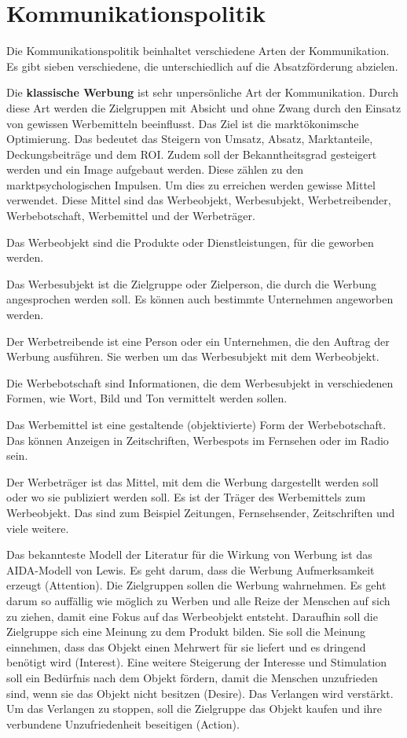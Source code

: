 \autocite[Vgl.][]{MarketingMB}
\section{Kommunikationspolitik}
Die Kommunikationspolitik beinhaltet verschiedene Arten der Kommunikation. Es gibt sieben verschiedene, die unterschiedlich auf die Absatzförderung abzielen. 

Die \textbf{klassische Werbung} ist sehr unpersönliche Art der Kommunikation. Durch diese Art werden die Zielgruppen mit Absicht und ohne Zwang durch den Einsatz von gewissen Werbemitteln beeinflusst. Das Ziel ist die marktökonimsche Optimierung. Das bedeutet das Steigern von Umsatz, Absatz, Marktanteile, Deckungsbeiträge und dem ROI. Zudem soll der Bekanntheitsgrad gesteigert werden und ein Image aufgebaut werden. Diese zählen zu den marktpsychologischen Impulsen.
Um dies zu erreichen werden gewisse Mittel verwendet. Diese Mittel sind das Werbeobjekt, Werbesubjekt, Werbetreibender, Werbebotschaft, Werbemittel und der Werbeträger.

Das Werbeobjekt sind die Produkte oder Dienstleistungen, für die geworben werden. 

Das Werbesubjekt ist die Zielgruppe oder Zielperson, die durch die Werbung angesprochen werden soll. Es können auch bestimmte Unternehmen angeworben werden.

Der Werbetreibende ist eine Person oder ein Unternehmen, die den Auftrag der Werbung ausführen. Sie werben um das Werbesubjekt mit dem Werbeobjekt.

Die Werbebotschaft sind Informationen, die dem Werbesubjekt in verschiedenen Formen, wie Wort, Bild und Ton vermittelt werden sollen.

Das Werbemittel ist eine gestaltende (objektivierte) Form der Werbebotschaft. Das können Anzeigen in Zeitschriften, Werbespots im Fernsehen oder im Radio sein.

Der Werbeträger ist das Mittel, mit dem die Werbung dargestellt werden soll oder wo sie publiziert werden soll. Es ist der Träger des Werbemittels zum Werbeobjekt. Das sind zum Beispiel Zeitungen, Fernsehsender, Zeitschriften und viele weitere.

Das bekannteste Modell der Literatur für die Wirkung von Werbung ist das AIDA-Modell von Lewis. Es geht darum, dass die Werbung Aufmerksamkeit erzeugt (Attention). Die Zielgruppen sollen die Werbung wahrnehmen. Es geht darum so auffällig wie möglich zu Werben und alle Reize der Menschen auf sich zu ziehen, damit eine Fokus auf das Werbeobjekt entsteht. Daraufhin soll die Zielgruppe sich eine Meinung zu dem Produkt bilden. Sie soll die Meinung einnehmen, dass das Objekt einen Mehrwert für sie liefert und es dringend benötigt wird (Interest). Eine weitere Steigerung der Interesse und Stimulation soll ein Bedürfnis nach dem Objekt fördern, damit die Menschen unzufrieden sind, wenn sie das Objekt nicht besitzen (Desire). Das Verlangen wird verstärkt. Um das Verlangen zu stoppen, soll die Zielgruppe das Objekt kaufen und ihre verbundene Unzufriedenheit beseitigen (Action).

